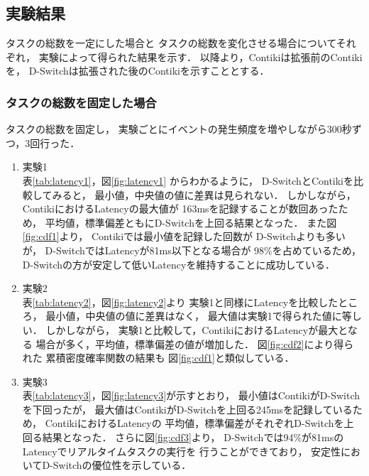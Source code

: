 \subsection{実験結果}
タスクの総数を一定にした場合と
タスクの総数を変化させる場合についてそれぞれ，
実験によって得られた結果を示す．
以降より，Contikiは拡張前のContikiを，
D-Switchは拡張された後のContikiを示すこととする．

\subsubsection{タスクの総数を固定した場合}

\vspace{0.5em}タスクの総数を固定し，
実験ごとにイベントの発生頻度を増やしながら300秒ずつ，3回行った．

\begin{enumerate}
\item{実験1}\\
表\ref{tab:latency1}，図\ref{fig:latency1}
からわかるように，
D-SwitchとContikiを比較してみると，
最小値，中央値の値に差異は見られない．
しかしながら，
ContikiにおけるLatencyの最大値が
163msを記録することが数回あったため，
平均値，標準偏差ともにD-Switchを上回る結果となった．
また図\ref{fig:cdf1}より，
Contikiでは最小値を記録した回数が
D-Switchよりも多いが，
D-SwitchではLatencyが81ms以下となる場合が
98\%を占めているため，
D-Switchの方が安定して低いLatencyを維持することに成功している．
\newline
\item{実験2}\\
表\ref{tab:latency2}，図\ref{fig:latency2}より
実験1と同様にLatencyを比較したところ，
最小値，中央値の値に差異はなく，
最大値は実験1で得られた値に等しい．
しかしながら，
実験1と比較して，ContikiにおけるLatencyが最大となる
場合が多く，平均値，標準偏差の値が増加した．
図\ref{fig:cdf2}により得られた
累積密度確率関数の結果も
図\ref{fig:cdf1}と類似している．
\newline
\item{実験3}\\
表\ref{tab:latency3}，図\ref{fig:latency3}が示すとおり，
最小値はContikiがD-Switchを下回ったが，
最大値はContikiがD-Switchを上回る245msを記録しているため，
ContikiにおけるLatencyの
平均値，標準偏差がそれぞれD-Switchを上回る結果となった．
さらに図\ref{fig:cdf3}より，
D-Switchでは94\%が81msのLatencyでリアルタイムタスクの実行を
行うことができており，
安定性においてD-Switchの優位性を示している．
\end{enumerate}


